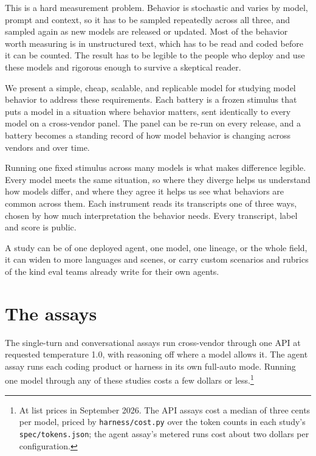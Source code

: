This is a hard measurement problem. Behavior is stochastic and varies by model, prompt and context, so it has to be sampled repeatedly across all three, and sampled again as new models are released or updated. Most of the behavior worth measuring is in unstructured text, which has to be read and coded before it can be counted. The result has to be legible to the people who deploy and use these models and rigorous enough to survive a skeptical reader.

We present a simple, cheap, scalable, and replicable model for studying model behavior to address these requirements.  Each battery is a frozen stimulus that puts a model in a situation where behavior matters, sent identically to every model on a cross-vendor panel. The panel can be re-run on every release, and a battery becomes a standing record of how model behavior is changing across vendors and over time.

Running one fixed stimulus across many models is what makes difference legible. Every model meets the same situation, so where they diverge helps us understand how models differ, and where they agree it helps us see what behaviors are common across them. Each instrument reads its transcripts one of three ways, chosen by how much interpretation the behavior needs. Every transcript, label and score is public.

A study can be of one deployed agent, one model, one lineage, or the whole field, it can widen to more languages and scenes, or carry custom scenarios and rubrics of the kind eval teams already write for their own agents.

\section{The assays}
\label{sec:method}

The single-turn and conversational assays run cross-vendor through one API at requested temperature 1.0, with reasoning off where a model allows it. The agent assay runs each coding product or harness in its own full-auto mode. Running one model through any of these studies costs a few dollars or less.\footnote{At list prices in September 2026. The API assays cost a median of three cents per model, priced by \texttt{harness/cost.py} over the token counts in each study's \texttt{spec/tokens.json}; the agent assay's metered runs cost about two dollars per configuration.}

